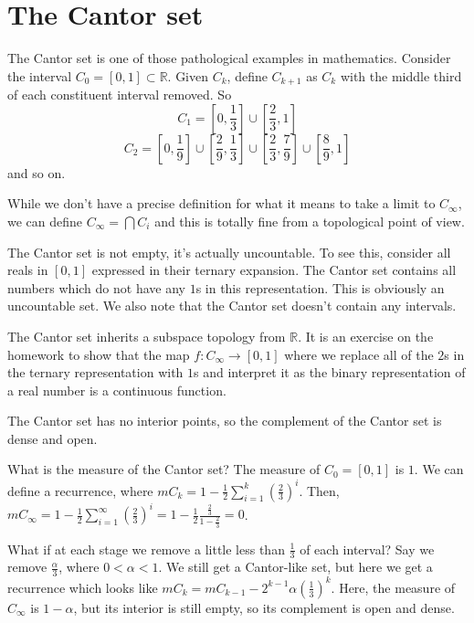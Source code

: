 
\section*{The Cantor set}

The Cantor set is one of those pathological examples in mathematics.  Consider the interval $C_0=[0,1]\subset\mathbb{R}$.  Given $C_k$, define $C_{k+1}$ as $C_k$ with the middle third of each constituent interval removed.  So $$C_1=[0,\frac{1}{3}]\cup[\frac{2}{3},1]$$ $$C_2=[0,\frac{1}{9}]\cup[\frac{2}{9},\frac{1}{3}]\cup[\frac{2}{3},\frac{7}{9}]\cup[\frac{8}{9},1]$$ and so on.

While we don't have a precise definition for what it means to take a limit to $C_\infty$, we can define $C_\infty=\bigcap C_i$ and this is totally fine from a topological point of view.




The Cantor set is not empty, it's actually uncountable.  To see this, consider all reals in $[0,1]$ expressed in their ternary expansion.  The Cantor set contains all numbers which do not have any $1$s in this representation.  This is obviously an uncountable set.  We also note that the Cantor set doesn't contain any intervals.  

The Cantor set inherits a subspace topology from $\mathbb{R}$.  It is an exercise on the homework to show that the map $f:C_\infty \rightarrow [0,1]$ where we replace all of the $2$s in the ternary representation with $1$s and interpret it as the binary representation of a real number is a continuous function.

The Cantor set has no interior points, so the complement of the Cantor set is dense and open.


What is the measure of the Cantor set?  The measure of $C_0=[0,1]$ is $1$.  We can define a recurrence, where $mC_k=1-\frac{1}{2}\sum\limits_{i=1}^{k}(\frac{2}{3})^i$.  Then, $mC_\infty = 1-\frac{1}{2}\sum\limits_{i=1}^{\infty}(\frac{2}{3})^i = 1-\frac{1}{2}\frac{\frac{2}{3}}{1-\frac{2}{3}}=0$.

What if at each stage we remove a little less than $\frac{1}{3}$ of each interval?  Say we remove $\frac{\alpha}{3}$, where $0<\alpha<1$.  We still get a Cantor-like set, but here we get a recurrence which looks like $mC_k=mC_{k-1}-2^{k-1}\alpha(\frac{1}{3})^k$.  Here, the measure of $C_\infty$ is $1-\alpha$, but its interior is still empty, so its complement is open and dense.


